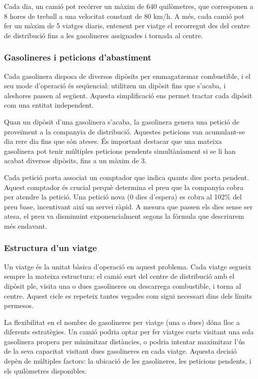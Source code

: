 Cada dia, un camió pot recórrer un màxim de 640 quilòmetres, que corresponen a 8 hores de treball a una velocitat constant de 80 km/h. A més, cada camió pot fer un màxim de 5 viatges diaris, entenent per viatge el recorregut des del centre de distribució fins a les gasolineres assignades i tornada al centre.

\vspace{0.5cm}

\subsubsection{Gasolineres i peticions d'abastiment}

 Cada gasolinera disposa de diversos dipòsits per emmagatzemar combustible, i el seu mode d'operació és seqüencial: utilitzen un dipòsit fins que s'acaba, i aleshores passen al següent. Aquesta simplificació ens permet tractar cada dipòsit com una entitat independent.

Quan un dipòsit d'una gasolinera s'acaba, la gasolinera genera una petició de proveïment a la companyia de distribució. Aquestes peticions van acumulant-se dia rere dia fins que són ateses. És important destacar que una mateixa gasolinera pot tenir múltiples peticions pendents simultàniament si se li han acabat diversos dipòsits, fins a un màxim de 3.

Cada petició porta associat un comptador que indica quants dies porta pendent. Aquest comptador és crucial perquè determina el preu que la companyia cobra per atendre la petició. Una petició nova (0 dies d'espera) es cobra al 102\% del preu base, incentivant així un servei ràpid. A mesura que passen els dies sense ser atesa, el preu va disminuint exponencialment segons la fórmula que descriurem més endavant.

\vspace{0.5cm}

\subsubsection{Estructura d'un viatge}

Un viatge és la unitat bàsica d'operació en aquest problema. Cada viatge segueix sempre la mateixa estructura: el camió surt del centre de distribució amb el dipòsit ple, visita una o dues gasolineres on descarrega combustible, i torna al centre. Aquest cicle es repeteix tantes vegades com sigui necessari dins dels límits permesos.

La flexibilitat en el nombre de gasolineres per viatge (una o dues) dóna lloc a diferents estratègies. Un camió podria optar per fer viatges curts visitant una sola gasolinera propera per minimitzar distàncies, o podria intentar maximitzar l'ús de la seva capacitat visitant dues gasolineres en cada viatge. Aquesta decisió depèn de múltiples factors: la ubicació de les gasolineres, les peticions pendents, i els quilòmetres disponibles.

